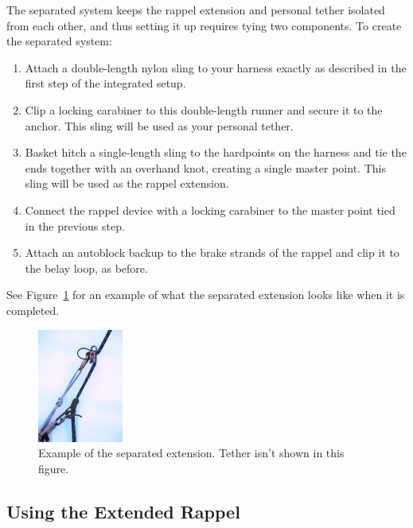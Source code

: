 \documentclass[nonacm,acmtog]{acmart}
\begin{document}
   The separated system keeps the rappel extension and personal tether isolated
   from each other, and thus setting it up requires tying two components.  To
   create the separated system:

   \begin{enumerate}
      \item Attach a double-length nylon sling to your harness exactly as
      described in the first step of the integrated setup.

      \item Clip a locking carabiner to this double-length runner and secure it
      to the anchor.  This sling will be used as your personal tether.

      \item Basket hitch a single-length sling to the hardpoints on the harness
      and tie the ends together with an overhand knot, creating a single master
      point.  This sling will be used as the rappel extension.

      \item Connect the rappel device with a locking carabiner to the master
      point tied in the previous step.

      \item Attach an autoblock backup to the brake strands of the rappel and
      clip it to the belay loop, as before.
   \end{enumerate}

   See Figure~\ref{fig:separated} for an example of what the separated
   extension looks like when it is completed.

   \begin{figure}
      \centering
      \includegraphics[width=0.25\textwidth]{images/separated.jpg}
      \caption{Example of the separated extension.  Tether isn't shown in this
         figure.}
      \label{fig:separated}
   \end{figure}

\subsection{Using the Extended Rappel}
\label{sec:using}
\end{document}
